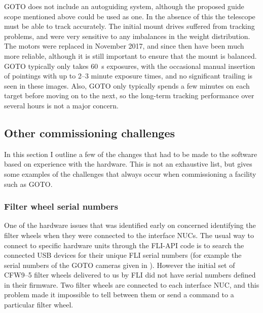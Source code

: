 \begin{colsection}
\begin{colsection}
GOTO does not include an autoguiding system, although the proposed guide scope mentioned above could be used as one. In the absence of this the telescope must be able to track accurately. The initial mount drives suffered from tracking problems, and were very sensitive to any imbalances in the weight distribution. The motors were replaced in November 2017, and since then have been much more reliable, although it is still important to ensure that the mount is balanced. GOTO typically only takes \SI{60}{\second} exposures, with the occasional manual insertion of pointings with up to 2--3 minute exposure times, and no significant trailing is seen in these images. Also, GOTO only typically spends a few minutes on each target before moving on to the next, so the long-term tracking performance over several hours is not a major concern.

\end{colsection}


\subsection{Other commissioning challenges}
\label{sec:challenges}
\begin{colsection}

In this section I outline a few of the changes that had to be made to the software based on experience with the hardware. This is not an exhaustive list, but gives some examples of the challenges that always occur when commissioning a facility such as GOTO.\@

\subsubsection{Filter wheel serial numbers}

One of the hardware issues that was identified early on concerned identifying the filter wheels when they were connected to the interface NUCs. The usual way to connect to specific hardware units through the FLI-API code is to search the connected USB devices for their unique FLI serial numbers (for example the serial numbers of the GOTO cameras given in ). However the initial set of CFW9--5 filter wheels delivered to us by FLI did not have serial numbers defined in their firmware. Two filter wheels are connected to each interface NUC, and this problem made it impossible to tell between them or send a command to a particular filter wheel.


\end{colsection}
\end{colsection}
